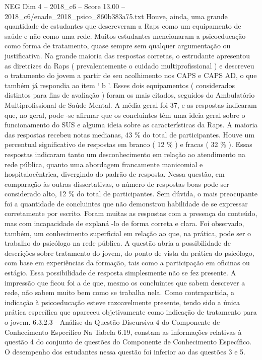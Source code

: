 \begin{textsample}{NEG Dim 4 – 2018\_c6 – Score 13.00 – 2018\_c6/enade\_2018\_psico\_860b383a75.txt}
Houve, ainda, uma grande quantidade de estudantes que descreveram a Raps como um equipamento de saúde e não como uma rede.
Muitos estudantes mencionaram a psicoeducação como forma de tratamento, quase sempre sem qualquer argumentação ou justificativa.
Na grande maioria das respostas corretas, o estrudante apresentou as diretrizes da Raps ( prevalentemente o cuidado multiprofissional ) e descreveu o tratamento do jovem a partir de seu acolhimento nos CAPS e CAPS AD, o que também já respondia ao item ‘ b ’.
Esses dois equipamentos ( considerados distintos para fins de avaliação ) foram os mais citados, seguidos do Ambulatório Multiprofissional de Saúde Mental.
A média geral foi 37, e as respostas indicaram que, no geral, pode -se afirmar que os concluintes têm uma ideia geral sobre o funcionamento do SUS e alguma ideia sobre as características da Raps.
A maioria das respostas recebeu notas medianas, 43 \% do total de participantes.
Houve um percentual significativo de respostas em branco ( 12 \% ) e fracas ( 32 \% ).
Essas respostas indicaram tanto um desconhecimento em relação ao atendimento na rede pública, quanto uma abordagem francamente manicomial e hospitalocêntrica, divergindo do padrão de resposta.
Nessa questão, em comparação às outras dissertativas, o número de respostas boas pode ser considerado alto, 12 \% do total de participantes.
Sem dúvida, o mais preocupante foi a quantidade de concluintes que não demonstrou habilidade de se expressar corretamente por escrito.
Foram muitas as respostas com a presença do conteúdo, mas com incapacidade de explaná -lo de forma correta e clara.
Foi observado, também, um conhecimento superficial em relação ao que, na prática, pode ser o trabalho do psicólogo na rede pública.
A questão abria a possibilidade de descrições sobre tratamento do jovem, do ponto de vista da prática do psicólogo, com base em experiências da formação, tais como a participação em oficinas ou estágio.
Essa possibilidade de resposta simplesmente não se fez presente.
A impressão que ficou foi a de que, mesmo os concluintes que sabem descrever a rede, não sabem muito bem como se trabalha nela.
Como contrapartida, a indicação à psicoeducação esteve razoavelmente presente, tendo sido a única prática específica que apareceu objetivamente como indicação de tratamento para o jovem. 6.3.2.3 - Análise da Questão Discursiva 4 do Componente de Conhecimento Específico Na Tabela 6.19, constam as informações relativas à questão 4 do conjunto de questões do Componente de Conhecimento Específico.
O desempenho dos estudantes nessa questão foi inferior ao das questões 3 e 5.

\end{textsample}
